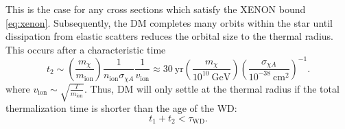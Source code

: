 \documentclass[preprintnumbers,amsmath,amssymb,prd,superscriptaddress]{revtex4}
\newcommand{\GeV}{\text{GeV}}
\newcommand{\cm}{\text{cm}}
\def\r{\right)}
\def\l{\left(}
\begin{document}
This is the case for any cross sections which satisfy the XENON bound \eqref{eq:xenon}. 
Subsequently, the DM completes many orbits within the star until dissipation from elastic scatters reduces the orbital size to the thermal radius.
This occurs after a characteristic time
\begin{equation}
t_2 \sim \l \frac{m_\chi}{m_\text{ion}} \r \frac{1}{n_\text{ion} \sigma_{\chi A}} \frac{1}{v_\text{ion}} \approx 30 ~\text{yr} \l \frac{m_\chi}{10^{10} ~\GeV} \r \l \frac{\sigma_{\chi A}}{10^{-38} ~\cm^2} \r^{-1}. 
\end{equation}
where $v_\text{ion} \sim \sqrt{\frac{T}{m_\text{ion}}}$.  
Thus, DM will only settle at the thermal radius if the total thermalization time is shorter than the age of the WD:
\begin{equation}
t_1 + t_2 < \tau_\text{WD}.
\end{equation}
\end{document}
